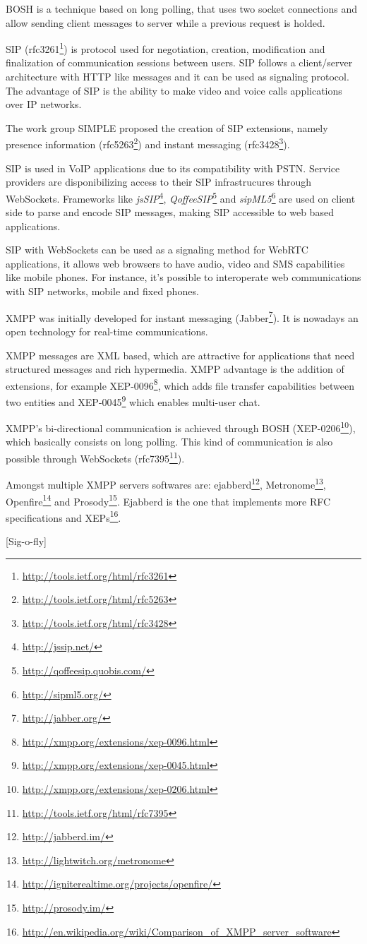   \ac{BOSH} is a technique based on long polling, that uses two socket connections and allow sending client messages to server while a previous request is holded.

  \ac{SIP} (rfc3261\footnote{\url{http://tools.ietf.org/html/rfc3261}}) is protocol used for negotiation, creation, modification and finalization of communication sessions between users. \ac{SIP} follows a client/server architecture with \ac{HTTP} like messages and it can be used as signaling protocol. The advantage of \ac{SIP} is the ability to make video and voice calls applications over \ac{IP} networks.

  The work group \ac{SIMPLE} proposed the creation of \ac{SIP} extensions, namely presence information (rfc5263\footnote{\url{http://tools.ietf.org/html/rfc5263}}) and instant messaging (rfc3428\footnote{\url{http://tools.ietf.org/html/rfc3428}}).

  \ac{SIP} is used in \ac{VoIP} applications due to its compatibility with \ac{PSTN}. Service providers are disponibilizing access to their \ac{SIP} infrastrucures through WebSockets. Frameworks like \textit{jsSIP}\footnote{\url{http://jssip.net/}}, \textit{QoffeeSIP}\footnote{\url{http://qoffeesip.quobis.com/}} and \textit{sipML5}\footnote{\url{http://sipml5.org/}} are used on client side to parse and encode \ac{SIP} messages, making \ac{SIP} accessible to web based applications. 

  \ac{SIP} with WebSockets can be used as a signaling method for WebRTC applications, it allows web browsers to have audio, video and \ac{SMS} capabilities like mobile phones. For instance, it's possible to interoperate web communications with \ac{SIP} networks, mobile and fixed phones.

  \ac{XMPP} was initially developed for instant messaging (Jabber\footnote{\url{http://jabber.org/}}). It is nowadays an open technology for real-time communications. 

  \ac{XMPP} messages are \ac{XML} based, which are attractive for applications that need structured messages and rich hypermedia. \ac{XMPP} advantage is the addition of extensions, for example XEP-0096\footnote{\url{http://xmpp.org/extensions/xep-0096.html}}, which adds file transfer capabilities between two entities and XEP-0045\footnote{\url{http://xmpp.org/extensions/xep-0045.html}} which enables multi-user chat.

  \ac{XMPP}'s bi-directional communication is achieved through \ac{BOSH} (XEP-0206\footnote{\url{http://xmpp.org/extensions/xep-0206.html}}), which basically consists on long polling. This kind of communication is also possible through WebSockets (rfc7395\footnote{\url{http://tools.ietf.org/html/rfc7395}}).

  Amongst multiple XMPP servers softwares are: ejabberd\footnote{\url{http://jabberd.im/}}, Metronome\footnote{\url{http://lightwitch.org/metronome}}, Openfire\footnote{\url{http://igniterealtime.org/projects/openfire/}} and Prosody\footnote{\url{http://prosody.im/}}. Ejabberd is the one that implements more \ac{RFC} specifications and \ac{XEP}s\footnote{\url{http://en.wikipedia.org/wiki/Comparison_of_XMPP_server_software}}.

  {\color{red}[Sig-o-fly]}
